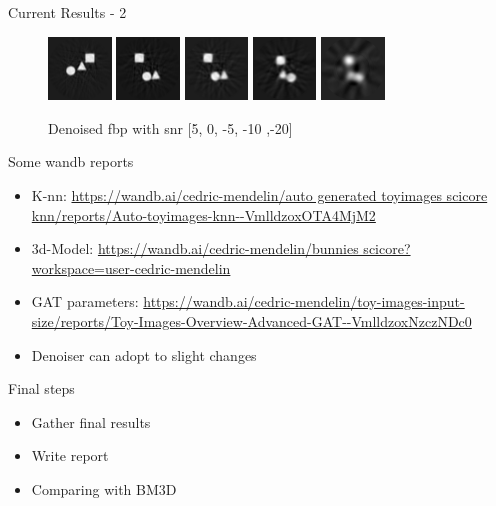 \documentclass[aspectratio=169]{beamer}
\begin{document}
\begin{frame}{Current Results - 2}
    \begin{figure}
        \includegraphics[width=0.15\textwidth]{denoised_fbp_5}
        \includegraphics[width=0.15\textwidth]{denoised_fbp_0}
        \includegraphics[width=0.15\textwidth]{denoised_fbp_n5}
        \includegraphics[width=0.15\textwidth]{denoised_fbp_n10}
        \includegraphics[width=0.15\textwidth]{denoised_fbp_n20}
        \caption{Denoised fbp with snr [5, 0, -5, -10 ,-20]}
    \end{figure}
    
\end{frame}

\begin{frame}{Some wandb reports}
    \begin{itemize}
        \item K-nn: \url{https://wandb.ai/cedric-mendelin/auto generated toyimages scicore knn/reports/Auto-toyimages-knn--VmlldzoxOTA4MjM2}
        \item 3d-Model: \url{https://wandb.ai/cedric-mendelin/bunnies scicore?workspace=user-cedric-mendelin}
        \item GAT parameters: \url{https://wandb.ai/cedric-mendelin/toy-images-input-size/reports/Toy-Images-Overview-Advanced-GAT--VmlldzoxNzczNDc0}
        \item Denoiser can adopt to slight changes 
    \end{itemize}
    
    

\end{frame}

\begin{frame}{Final steps}
    \begin{itemize}
        \item Gather final results
        \item Write report
        \item Comparing with BM3D
    \end{itemize}
\end{frame}
\end{document}
